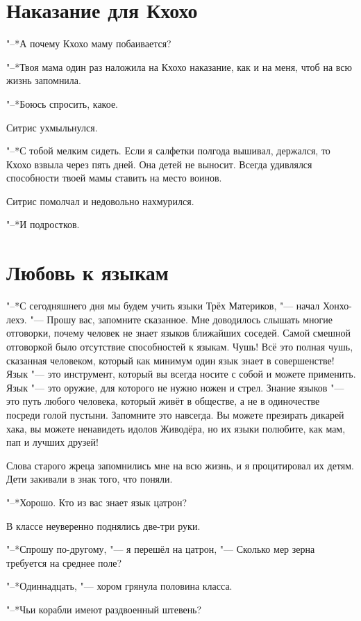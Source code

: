 \documentclass[a4paper,10pt]{book}
\begin{document}
\section{Наказание для Кхохо}

"--*А почему Кхохо маму побаивается?

"--*Твоя мама один раз наложила на Кхохо наказание, как и на меня, чтоб на всю 
жизнь запомнила.

"--*Боюсь спросить, какое.

Ситрис ухмыльнулся.

"--*С тобой мелким сидеть. Если я салфетки полгода вышивал, держался, то Кхохо 
взвыла через пять дней. Она детей не выносит. Всегда удивлялся способности 
твоей мамы ставить на место воинов.

Ситрис помолчал и недовольно нахмурился.

"--*И подростков.

\section{Любовь к языкам}

"--*С сегодняшнего дня мы будем учить языки Трёх Материков, "--- начал 
Хонхо-лехэ. "--- Прошу вас, запомните сказанное. Мне доводилось слышать многие 
отговорки, почему человек не знает языков ближайших соседей. Самой смешной 
отговоркой было отсутствие способностей к языкам. Чушь! Всё это полная чушь, 
сказанная человеком, который как минимум один язык знает в совершенстве! Язык 
"--- это инструмент, который вы всегда носите с собой и можете применить. Язык 
"--- это оружие, для которого не нужно ножен и стрел. Знание языков "--- это 
путь любого человека, который живёт в обществе, а не в одиночестве посреди 
голой пустыни. Запомните это навсегда. Вы можете презирать дикарей хака, вы 
можете ненавидеть идолов Живодёра, но их языки полюбите, как мам, пап и лучших 
друзей!

Слова старого жреца запомнились мне на всю жизнь, и я процитировал их детям.
Дети закивали в знак того, что поняли.

"--*Хорошо. Кто из вас знает язык цатрон?

В классе неуверенно поднялись две-три руки.

"--*Спрошу по-другому, "--- я перешёл на цатрон, "--- Сколько
мер зерна требуется на среднее поле?

"--*Одиннадцать, "--- хором грянула половина класса.

"--*Чьи корабли имеют раздвоенный штевень?
\end{document}
